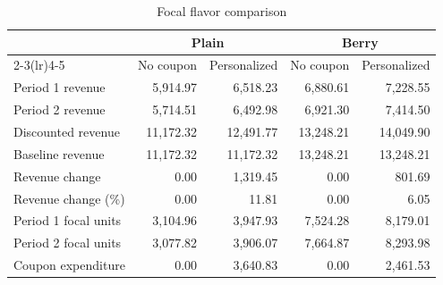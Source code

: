 \begin{table}[htbp]
\centering
\small
\setlength{\tabcolsep}{4pt}
\caption{Focal flavor comparison}
\label{tab:focal-flavor-comparison}
\begin{tabular}{lrrrr}
\toprule
 & \multicolumn{2}{c}{Plain} & \multicolumn{2}{c}{Berry} \\
\cmidrule(lr){2-3}\cmidrule(lr){4-5}
 & No coupon & Personalized & No coupon & Personalized \\
\midrule
Period 1 revenue & 5,914.97 & 6,518.23 & 6,880.61 & 7,228.55 \\
Period 2 revenue & 5,714.51 & 6,492.98 & 6,921.30 & 7,414.50 \\
Discounted revenue & 11,172.32 & 12,491.77 & 13,248.21 & 14,049.90 \\
Baseline revenue & 11,172.32 & 11,172.32 & 13,248.21 & 13,248.21 \\
Revenue change & 0.00 & 1,319.45 & 0.00 & 801.69 \\
Revenue change (\%) & 0.00 & 11.81 & 0.00 & 6.05 \\
Period 1 focal units & 3,104.96 & 3,947.93 & 7,524.28 & 8,179.01 \\
Period 2 focal units & 3,077.82 & 3,906.07 & 7,664.87 & 8,293.98 \\
Coupon expenditure & 0.00 & 3,640.83 & 0.00 & 2,461.53 \\
\bottomrule
\end{tabular}
\end{table}
